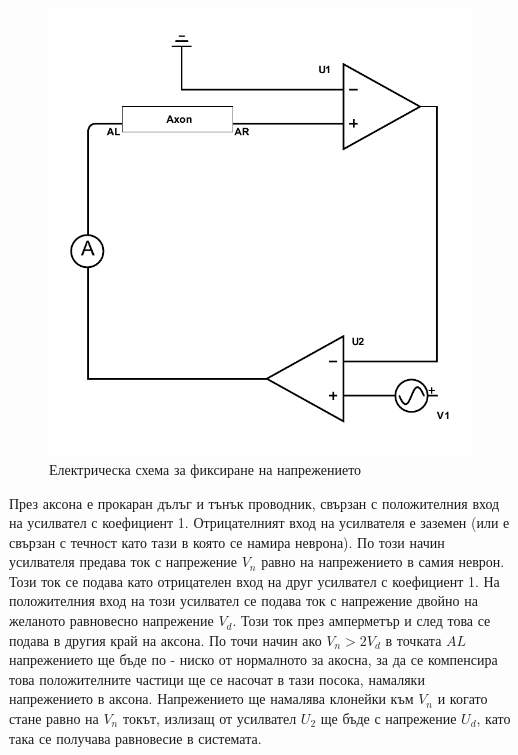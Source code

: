 \documentclass{article}
\begin{document}
        \begin{figure}[h!]
            \centering
            \includegraphics{./schemas/voltage-clamp.pdf}
            \caption{Електрическа схема за фиксиране на напрежението}
        \end{figure}

        През аксона е прокаран дълъг и тънък проводник, свързан с положителния вход на усилвател с коефициент 1. Отрицателният вход на усилвателя
        е заземен (или е свързан с течност като тази в която се намира неврона). По този начин усилвателя предава ток с напрежение $V_n$ равно на
        напрежението в самия неврон. Този ток се подава като отрицателен вход на друг усилвател с коефициент 1. На положителния вход на този
        усилвател се подава ток с напрежение двойно на желаното равновесно напрежение $V_d$. Този ток през амперметър и след това се подава в
        другия край на аксона. По точи начин ако $V_n > 2V_d$ в точката $AL$ напрежението ще бъде по - ниско от нормалното за акосна, за да се
        компенсира това положителните частици ще се насочат в тази посока, намаляки напрежението в аксона. Напрежението ще намалява клонейки към
        $V_n$ и когато стане равно на $V_n$ токът, излизащ от усилвател $U_2$ ще бъде с напрежение $U_d$, като така се получава равновесие в
        системата.
\end{document}
